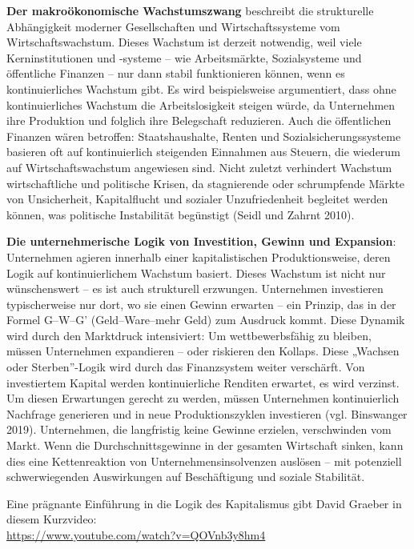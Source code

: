 \documentclass[
  nswissgerman,
  a4paper,
  DIV=11,
  numbers=noendperiod,
  oneside,
  openany]{scrreprt}
\begin{document}
\textbf{Der makroökonomische Wachstumszwang} beschreibt die strukturelle
Abhängigkeit moderner Gesellschaften und Wirtschaftssysteme vom
Wirtschaftswachstum. Dieses Wachstum ist derzeit notwendig, weil viele
Kerninstitutionen und -systeme -- wie Arbeitsmärkte, Sozialsysteme und
öffentliche Finanzen -- nur dann stabil funktionieren können, wenn es
kontinuierliches Wachstum gibt. Es wird beispielsweise argumentiert,
dass ohne kontinuierliches Wachstum die Arbeitslosigkeit steigen würde,
da Unternehmen ihre Produktion und folglich ihre Belegschaft reduzieren.
Auch die öffentlichen Finanzen wären betroffen: Staatshaushalte, Renten
und Sozialsicherungssysteme basieren oft auf kontinuierlich steigenden
Einnahmen aus Steuern, die wiederum auf Wirtschaftswachstum angewiesen
sind. Nicht zuletzt verhindert Wachstum wirtschaftliche und politische
Krisen, da stagnierende oder schrumpfende Märkte von Unsicherheit,
Kapitalflucht und sozialer Unzufriedenheit begleitet werden können, was
politische Instabilität begünstigt (Seidl und Zahrnt 2010).

\textbf{Die unternehmerische Logik von Investition, Gewinn und
Expansion}: Unternehmen agieren innerhalb einer kapitalistischen
Produktionsweise, deren Logik auf kontinuierlichem Wachstum basiert.
Dieses Wachstum ist nicht nur wünschenswert -- es ist auch strukturell
erzwungen. Unternehmen investieren typischerweise nur dort, wo sie einen
Gewinn erwarten -- ein Prinzip, das in der Formel G--W--G'
(Geld--Ware--mehr Geld) zum Ausdruck kommt. Diese Dynamik wird durch den
Marktdruck intensiviert: Um wettbewerbsfähig zu bleiben, müssen
Unternehmen expandieren -- oder riskieren den Kollaps. Diese „Wachsen
oder Sterben''-Logik wird durch das Finanzsystem weiter verschärft. Von
investiertem Kapital werden kontinuierliche Renditen erwartet, es wird
verzinst. Um diesen Erwartungen gerecht zu werden, müssen Unternehmen
kontinuierlich Nachfrage generieren und in neue Produktionszyklen
investieren (vgl. Binswanger 2019). Unternehmen, die langfristig keine
Gewinne erzielen, verschwinden vom Markt. Wenn die Durchschnittsgewinne
in der gesamten Wirtschaft sinken, kann dies eine Kettenreaktion von
Unternehmensinsolvenzen auslösen -- mit potenziell schwerwiegenden
Auswirkungen auf Beschäftigung und soziale Stabilität.

Eine prägnante Einführung in die Logik des Kapitalismus gibt David
Graeber in diesem Kurzvideo:\\
\url{https://www.youtube.com/watch?v=QOVnb3y8hm4}
\end{document}
